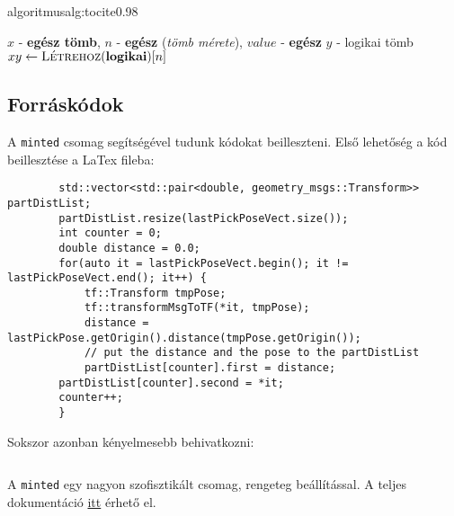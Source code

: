 \documentclass[12pt,a4paper]{article}
\begin{document}
	\begin{algorithmforus}{algoritmus}{alg:tocite}{0.98}   
        \begin{algorithmic}[1]
            \Require $x$ - \textbf{egész tömb}, $n$ - \textbf{egész} (\textit{tömb mérete}), $value$ - \textbf{egész}
            \Ensure $y$ - logikai tömb
                \State $xy \leftarrow \textsc{Létrehoz}(\textbf{logikai})[n] $
                    \Else
                    \EndIf
                \EndFor   
            \EndProcedure
        \end{algorithmic}
    \end{algorithmforus}
	    
	 
	    
	\subsection{Forráskódok}	
	
	A \verb|minted| csomag segítségével tudunk kódokat beilleszteni. Első lehetőség a kód beillesztése a LaTex fileba: 
	
	\begin{verbatim}
		std::vector<std::pair<double, geometry_msgs::Transform>> partDistList;
		partDistList.resize(lastPickPoseVect.size());
		int counter = 0;
		double distance = 0.0;
		for(auto it = lastPickPoseVect.begin(); it != lastPickPoseVect.end(); it++) {
			tf::Transform tmpPose;
			tf::transformMsgToTF(*it, tmpPose);
			distance = lastPickPose.getOrigin().distance(tmpPose.getOrigin());
			// put the distance and the pose to the partDistList
			partDistList[counter].first = distance;
		partDistList[counter].second = *it;
		counter++;
		}
	\end{verbatim}
	
	Sokszor azonban kényelmesebb behivatkozni:
	
	\inputminted{c++}{code/example.cpp}
	
	A  \verb|minted| egy nagyon szofisztikált csomag, rengeteg beállítással. A teljes dokumentáció \href{https://ctan.org/pkg/minted?lang=en}{itt} érhető el.
	
\end{document}
